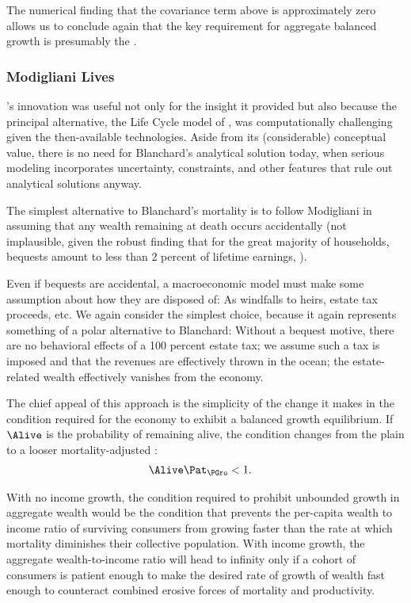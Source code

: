 \documentclass[BufferStockTheory]{subfiles}
\begin{document}
The numerical finding that the covariance term above is approximately zero allows us to conclude again that the key requirement for aggregate balanced growth is presumably the {\GICAbs}.

\hypertarget{Modigliani-Lives}{}
\subsubsection{Modigliani Lives}

\cite{blanchardFinite}'s innovation was useful not only for the insight it provided but also because the principal alternative, the Life Cycle model of \cite{modiglianiWealth}, was computationally challenging given the then-available technologies. Aside from its (considerable) conceptual value, there is no need for Blanchard's analytical solution today, when serious modeling incorporates uncertainty, constraints, and other features that rule out analytical solutions anyway.  %

The simplest alternative to Blanchard's mortality is to follow Modigliani in assuming that any wealth remaining at death occurs accidentally (not implausible, given the robust finding that for the great majority of households, bequests amount to less than 2 percent of lifetime earnings, \cite{hendricksBequests,hendricksSmallBequests}).

Even if bequests are accidental, a macroeconomic model must make some assumption about how they are disposed of: As windfalls to heirs, estate tax proceeds, etc. We again consider the simplest choice, because it again represents something of a polar alternative to Blanchard: Without a bequest motive, there are no behavioral effects of a 100 percent estate tax; we assume such a tax is imposed and that the revenues are effectively thrown in the ocean; the estate-related wealth effectively vanishes from the economy.

The chief appeal of this approach is the simplicity of the change it makes in the condition required for the economy to exhibit a balanced growth equilibrium.  If $\Alive$ is the probability of remaining alive, the condition changes from the plain {\GIC} to a looser mortality-adjusted {\GIC}:
\hypertarget{GICMrt}{}
\begin{align}
  \Alive  \Pat_{\PGro} & < 1. \label{eq:GICMrt}
\end{align}

With no income growth, the condition required to prohibit unbounded growth in aggregate wealth would be the condition that prevents the per-capita wealth to income ratio of surviving consumers from growing faster than the rate at which mortality diminishes their collective population.  With income growth, the aggregate wealth-to-income ratio will head to infinity only if a cohort of consumers is patient enough to make the desired rate of growth of wealth fast enough to counteract combined erosive forces of mortality and productivity.
\end{document}
